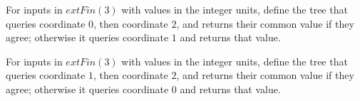 \begin{definition}
\label{FABL.majorityThreeTree02}
\leanok
{}
For inputs in $	ext{Fin}(3)$ with values in the integer units, define the tree that
queries coordinate $0$, then coordinate $2$, and returns their common value if they
agree; otherwise it queries coordinate $1$ and returns that value.
\end{definition}

\begin{definition}
\label{FABL.majorityThreeTree12}
\leanok
{}
For inputs in $	ext{Fin}(3)$ with values in the integer units, define the tree that
queries coordinate $1$, then coordinate $2$, and returns their common value if they
agree; otherwise it queries coordinate $0$ and returns that value.
\end{definition}

